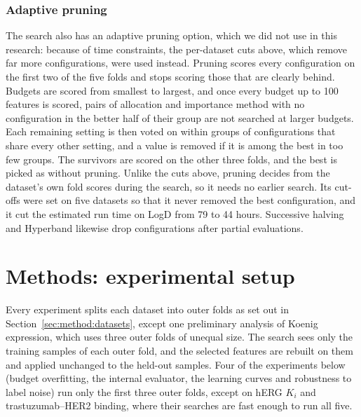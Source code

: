 \subsubsection{Adaptive pruning}\label{sec:method:pruning}
The search also has an adaptive pruning option, which we did not use in this research: because of time constraints, the per-dataset cuts above, which remove far more configurations, were used instead. Pruning scores every configuration on the first two of the five folds and stops scoring those that are clearly behind. Budgets are scored from smallest to largest, and once every budget up to 100 features is scored, pairs of allocation and importance method with no configuration in the better half of their group are not searched at larger budgets. Each remaining setting is then voted on within groups of configurations that share every other setting, and a value is removed if it is among the best in too few groups. The survivors are scored on the other three folds, and the best is picked as without pruning. Unlike the cuts above, pruning decides from the dataset's own fold scores during the search, so it needs no earlier search. Its cut-offs were set on five datasets so that it never removed the best configuration, and it cut the estimated run time on LogD from 79 to 44 hours. Successive halving \citep{Jamieson2016} and Hyperband \citep{Li2018Hyperband} likewise drop configurations after partial evaluations.

\section{Methods: experimental setup}

Every experiment splits each dataset into outer folds as set out in Section~\ref{sec:method:datasets}, except one preliminary analysis of Koenig expression, which uses three outer folds of unequal size. The search sees only the training samples of each outer fold, and the selected features are rebuilt on them and applied unchanged to the held-out samples. Four of the experiments below (budget overfitting, the internal evaluator, the learning curves and robustness to label noise) run only the first three outer folds, except on hERG $K_i$ and trastuzumab--HER2 binding, where their searches are fast enough to run all five. %

